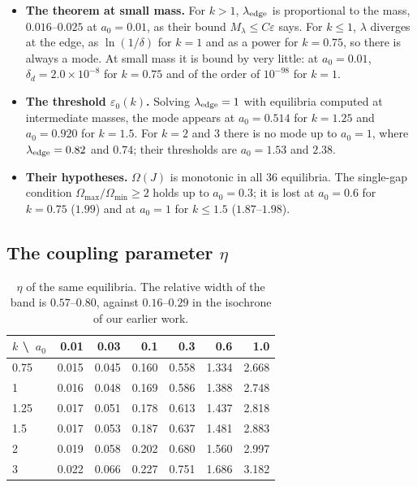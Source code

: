 \documentclass[11pt,a4paper]{article}
\begin{document}
\begin{itemize}
\item \textbf{The theorem at small mass.} For $k>1$, $\lambda_{\rm edge}$ is proportional to the
mass, $0.016$--$0.025$ at $a_0=0.01$, as their bound $M_\lambda\le C\varepsilon$ says. For $k\le1$,
$\lambda$ diverges at the edge, as $\ln(1/\delta)$ for $k=1$ and as a power for $k=0.75$, so there
is always a mode. At small mass it is bound by very little: at $a_0=0.01$,
$\delta_d=2.0\times10^{-8}$ for $k=0.75$ and of the order of $10^{-98}$ for $k=1$.
\item \textbf{The threshold $\varepsilon_0(k)$.} Solving $\lambda_{\rm edge}=1$ with equilibria
computed at intermediate masses, the mode appears at $a_0=0.514$ for $k=1.25$ and
$a_0=0.920$ for $k=1.5$. For $k=2$ and $3$ there is no mode up to $a_0=1$, where
$\lambda_{\rm edge}=0.82$ and $0.74$; their thresholds are $a_0=1.53$ and $2.38$.
\item \textbf{Their hypotheses.} $\Omega(J)$ is monotonic in all 36 equilibria. The single-gap
condition $\Omega_{\max}/\Omega_{\min}\ge2$ holds up to $a_0=0.3$; it is lost at $a_0=0.6$ for $k=0.75$
($1.99$) and at $a_0=1$ for $k\le1.5$ ($1.87$--$1.98$).
\end{itemize}

\subsection{The coupling parameter \texorpdfstring{$\eta$}{eta}}

\begin{table}[!htbp]
\centering
\small
\begin{tabular}{lrrrrrr}
\toprule
$k$ \textbackslash\ $a_0$ & 0.01 & 0.03 & 0.1 & 0.3 & 0.6 & 1.0\\
\midrule
0.75 & 0.015 & 0.045 & 0.160 & 0.558 & 1.334 & 2.668\\
1 & 0.016 & 0.048 & 0.169 & 0.586 & 1.388 & 2.748\\
1.25 & 0.017 & 0.051 & 0.178 & 0.613 & 1.437 & 2.818\\
1.5 & 0.017 & 0.053 & 0.187 & 0.637 & 1.481 & 2.883\\
2 & 0.019 & 0.058 & 0.202 & 0.680 & 1.560 & 2.997\\
3 & 0.022 & 0.066 & 0.227 & 0.751 & 1.686 & 3.182\\
\bottomrule
\end{tabular}
\caption{$\eta$ of the same equilibria. The relative width of the band is $0.57$--$0.80$,
against $0.16$--$0.29$ in the isochrone of our earlier work.}
\label{tab:eta}
\end{table}
\end{document}
